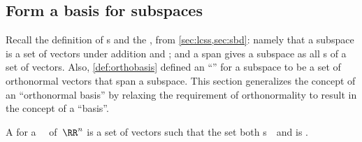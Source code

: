 \subsection{Form a basis for subspaces}


Recall the definition of s and the , from 
\cref{sec:lcss,sec:sbd}: namely that a subspace is 
a set of vectors  under addition and ; and a span gives a subspace as all s of a set of vectors.
Also, \cref{def:orthobasis} defined an ``'' for a subspace to be a set of orthonormal vectors that span a subspace.
This section generalizes the concept of an ``orthonormal basis'' by relaxing the requirement of orthonormality to result in the concept of a ``basis''.


\begin{definition} \label{def:basis} 
A  for a ~\WW\ of~\(\RR^n\) is a set of  vectors such that the set both s~\WW\ and is .
\end{definition}

